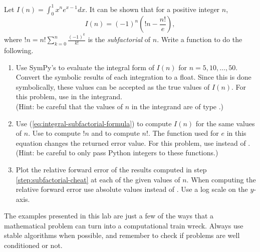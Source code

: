 \begin{problem}
Let $I(n) = \int_0^1 x^n e^{x - 1} dx$.
It can be shown that for a positive integer $n$,
\begin{equation}
I(n) = (-1)^n(!n - \frac{n!}{e}),
\label{eq:integral-subfactorial-formula}
\end{equation}
where $!n=n!\sum_{k=0}^{n} \frac{(-1)^k}{k!}$ is the \emph{subfactorial} of $n$.
Write a function to do the following.
\begin{enumerate}
\item Use SymPy's  to evaluate the integral form of $I(n)$ for $n=5,10,\ldots,50$.
Convert the symbolic results of each integration to a float.
Since this is done symbolically, these values can be accepted as the true values of $I(n)$.
For this problem, use  in the integrand.
\\(Hint: be careful that the values of $n$ in the integrand are of type .)

\item Use (\ref{eq:integral-subfactorial-formula}) to compute $I(n)$ for the same values of $n$.
Use  to compute $!n$ and  to compute $n!$.
The function used for $e$ in this equation changes the returned error value. 
For this problem, use  instead of .
\\(Hint: be careful to only pass Python integers to these functions.)
\label{step:subfactorial-cheat}

\item Plot the relative forward error of the results computed in step \ref{step:subfactorial-cheat} at each of the given values of $n$.
When computing the relative forward error use absolute values instead of .
Use a log scale on the $y$-axis.

\end{enumerate}
\end{problem}

The examples presented in this lab are just a few of the ways that a mathematical problem can turn into a computational train wreck.
Always use stable algorithms when possible, and remember to check if problems are well conditioned or not.

